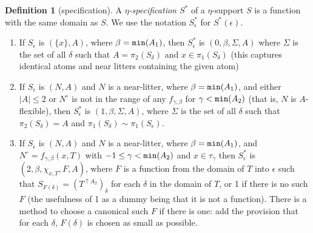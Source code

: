 \documentclass[112pt]{article}
\theoremstyle{definition}
\newtheorem{definition}[theorem]{Definition}
\theoremstyle{remark}
\newcommand{\rk}[1]{{\color{blue}\sl #1}}
\newcommand{\hsuggest}[1]{{\color{magenta}#1}}
\begin{document}
\begin{definition}[specification]
A {\em $\eta$-specification $S^*$\/} of a $\eta$-support $S$ is a function with the same domain as $S$.  We use the notation $S^*_\epsilon$ for $S^*(\epsilon)$.%


\begin{enumerate}

\item  If $S_{\epsilon}$ is $(\{x\},A)$, where $\beta={\tt min}(A_1)$, then $S^*_\epsilon$ is $(0,\beta,\Sigma,A)$ where  $\Sigma$ is the set of all $\delta$ such that $A=\pi_2(S_\delta)$ and $x \in  \pi_1(S_\delta)$ (this captures identical atoms and near litters containing the given atom)

\item  If $S_\epsilon$ is $(N,A)$ and $N$ is a near-litter, where $\beta={\tt min}(A_1)$, and either $|A|\leq 2$ or $N^\circ$ is not in the range of any $f_{\gamma,\beta}$ for $\gamma<{\tt min}(A_2)$ (that is, $N$ is $A$-flexible), then $S^*_\epsilon$ is $(1,\beta,\Sigma,A)$, where $\Sigma$ is the set of all $\delta$ such that $\pi_2(S_\delta) = A$
and $\pi_1(S_\delta) \sim \pi_1(S_\epsilon)$. %

\item  If $S_\epsilon$ is $(N,A)$ and $N$ is a near-litter, where $\beta={\tt min}(A_1)$, and $N^\circ=f_{\gamma,\beta}(x,T)$ with {$-1\leq\gamma<{\tt min}(A_2)$} and $x\in \tau_\gamma$ then
$S^*_\epsilon$ is $(2,\beta,\chi_{x,T},F,A)$, where $F$ is a function from the domain of $T$ into $\epsilon$
such that $S_{F(\delta)} = (T^{\uparrow A_2})_\delta$ for each $\delta$ in the domain of $T$, or 1 if there is no such $F$ (the usefulness of 1 as a dummy being that it is not a function).  There is a method to choose a canonical such $F$ if there is one:  add the provision that for each $\delta$, $F(\delta)$ is chosen as small as possible. %



\end{enumerate}
\end{definition}
\end{document}
